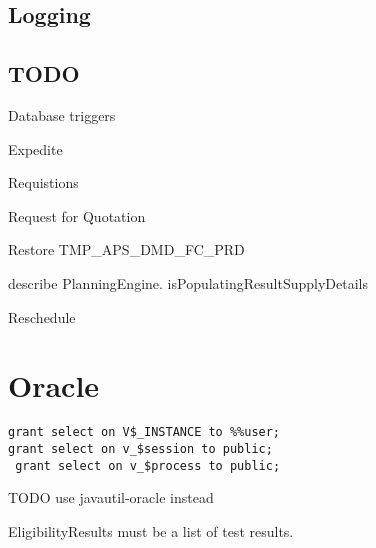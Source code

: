 \documentclass[a4paper,10pt]{book}
\begin{document}
\section{Logging}



\section{TODO}
Database triggers

Expedite

Requistions

Request for Quotation

Restore TMP\_APS\_DMD\_FC\_PRD

describe PlanningEngine. isPopulatingResultSupplyDetails

Reschedule

\chapter{Oracle}
\begin{verbatim}
grant select on V$_INSTANCE to %%user;
grant select on v_$session to public;
 grant select on v_$process to public;
\end{verbatim}

TODO use javautil-oracle instead

EligibilityResults must be a list of test results.
\end{document}
